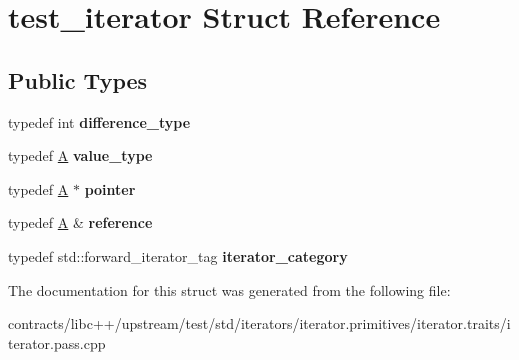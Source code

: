 \hypertarget{structtest__iterator}{}\section{test\+\_\+iterator Struct Reference}
\label{structtest__iterator}
\subsection*{Public Types}
\begin{DoxyCompactItemize}
\item 
\mbox{\label{structtest__iterator_ab75ee30a5fc70784b7da2fc646523f5d}} 
typedef int {\bfseries difference\+\_\+type}
\item 
\mbox{\label{structtest__iterator_ab0e6fccb553f65c35f6a099e6def685a}} 
typedef \mbox{\hyperlink{struct_a}{A}} {\bfseries value\+\_\+type}
\item 
\mbox{\label{structtest__iterator_ababe6508809ff8c2514e4cd131fc7d3c}} 
typedef \mbox{\hyperlink{struct_a}{A}} $\ast$ {\bfseries pointer}
\item 
\mbox{\label{structtest__iterator_a9aca4138da147bb03a1d2c1359a964a7}} 
typedef \mbox{\hyperlink{struct_a}{A}} \& {\bfseries reference}
\item 
\mbox{\label{structtest__iterator_acd7d85d4ee2c14855b3ef2fbb34b4451}} 
typedef std\+::forward\+\_\+iterator\+\_\+tag {\bfseries iterator\+\_\+category}
\end{DoxyCompactItemize}


The documentation for this struct was generated from the following file\+:\begin{DoxyCompactItemize}
\item 
contracts/libc++/upstream/test/std/iterators/iterator.\+primitives/iterator.\+traits/iterator.\+pass.\+cpp\end{DoxyCompactItemize}
